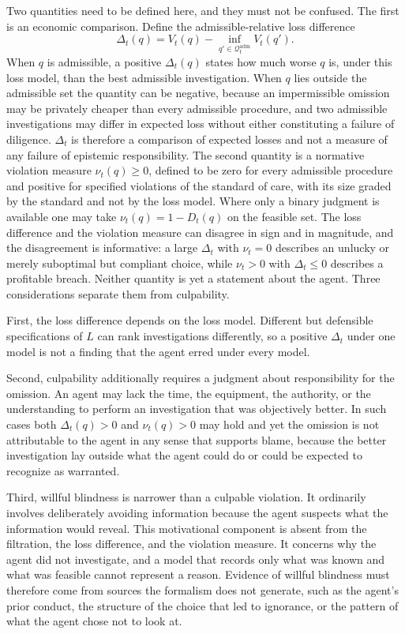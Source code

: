 \documentclass[11pt]{article}
\newcommand{\Q}{\mathcal Q}
\newcommand{\adm}{\mathrm{adm}}
\theoremstyle{definition}
\begin{document}
Two quantities need to be defined here, and they must not be confused. The first is an economic comparison. Define the admissible-relative loss difference
\[
\Delta_t(q)
=
V_t(q)-\inf_{q'\in\Q_t^{\adm}}V_t(q').
\]
When $q$ is admissible, a positive $\Delta_t(q)$ states how much worse $q$ is, under this loss model, than the best admissible investigation. When $q$ lies outside the admissible set the quantity can be negative, because an impermissible omission may be privately cheaper than every admissible procedure, and two admissible investigations may differ in expected loss without either constituting a failure of diligence. $\Delta_t$ is therefore a comparison of expected losses and not a measure of any failure of epistemic responsibility. The second quantity is a normative violation measure $\nu_t(q)\ge 0$, defined to be zero for every admissible procedure and positive for specified violations of the standard of care, with its size graded by the standard and not by the loss model. Where only a binary judgment is available one may take $\nu_t(q)=1-D_t(q)$ on the feasible set. The loss difference and the violation measure can disagree in sign and in magnitude, and the disagreement is informative: a large $\Delta_t$ with $\nu_t=0$ describes an unlucky or merely suboptimal but compliant choice, while $\nu_t>0$ with $\Delta_t\le 0$ describes a profitable breach. Neither quantity is yet a statement about the agent. Three considerations separate them from culpability.

First, the loss difference depends on the loss model. Different but defensible specifications of $L$ can rank investigations differently, so a positive $\Delta_t$ under one model is not a finding that the agent erred under every model.

Second, culpability additionally requires a judgment about responsibility for the omission. An agent may lack the time, the equipment, the authority, or the understanding to perform an investigation that was objectively better. In such cases both $\Delta_t(q)>0$ and $\nu_t(q)>0$ may hold and yet the omission is not attributable to the agent in any sense that supports blame, because the better investigation lay outside what the agent could do or could be expected to recognize as warranted.

Third, willful blindness is narrower than a culpable violation. It ordinarily involves deliberately avoiding information because the agent suspects what the information would reveal. This motivational component is absent from the filtration, the loss difference, and the violation measure. It concerns why the agent did not investigate, and a model that records only what was known and what was feasible cannot represent a reason. Evidence of willful blindness must therefore come from sources the formalism does not generate, such as the agent's prior conduct, the structure of the choice that led to ignorance, or the pattern of what the agent chose not to look at.
\end{document}
